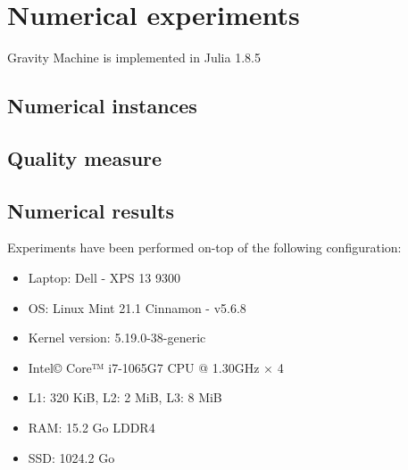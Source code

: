 \section{Numerical experiments}
Gravity Machine is implemented in Julia 1.8.5 \cite{Julia-2017}
\subsection{Numerical instances}
\subsection{Quality measure}
\subsection{Numerical results}
Experiments have been performed on-top of the following configuration:
\begin{itemize}
    \item Laptop: Dell - XPS 13 9300
    \item OS: Linux Mint 21.1 Cinnamon - v5.6.8
    \item Kernel version: 5.19.0-38-generic
    \item Intel© Core™ i7-1065G7 CPU @ 1.30GHz × 4
    \item L1: 320 KiB, L2: 2 MiB, L3: 8 MiB
    \item RAM: 15.2 Go LDDR4
    \item SSD: 1024.2 Go
\end{itemize}
\subsubsection{}